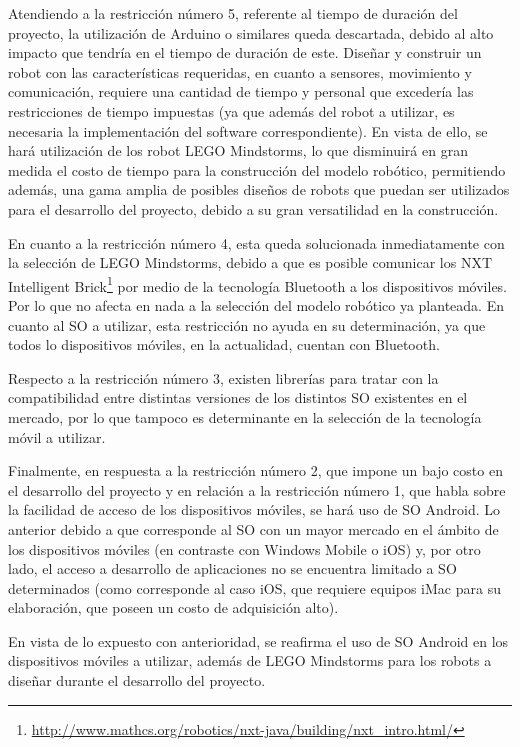 Atendiendo a la restricci\'on n\'umero 5, referente al tiempo de duraci\'on del proyecto, la utilizaci\'on de Arduino o similares queda descartada, debido al alto impacto que tendr\'ia en el tiempo de duraci\'on de este. Dise\~nar y construir un robot con las caracter\'isticas requeridas, en cuanto a sensores, movimiento y comunicaci\'on, requiere una cantidad de tiempo y per\-so\-nal que exceder\'ia las restricciones de tiempo impuestas (ya que adem\'as del robot a utilizar, es necesaria la implementaci\'on del software correspondiente). En vista de ello, se har\'a utilizaci\'on de los robot LEGO Mindstorms, lo que disminuir\'a en gran medida el costo de tiempo para la construcci\'on del modelo rob\'otico, permitiendo adem\'as, una gama amplia de posibles dise\~nos de robots que puedan ser utilizados para el desarrollo del proyecto, debido a su gran versatilidad en la construcci\'on.

En cuanto a la restricci\'on n\'umero 4, esta queda solucionada inmediatamente con la selecci\'on de LEGO Mindstorms, debido a que es posible comunicar los NXT Intelligent Brick\footnote{\url{http://www.mathcs.org/robotics/nxt-java/building/nxt_intro.html/}} por medio de la tecnolog\'ia Bluetooth a los dispositivos m\'oviles. Por lo que no afecta en nada a la selecci\'on del modelo rob\'otico ya planteada. En cuanto al SO a utilizar, esta restricci\'on no ayuda en su determinaci\'on, ya que todos lo dispositivos m\'oviles, en la actualidad, cuentan con Bluetooth.

Respecto a la restricci\'on n\'umero 3, existen librer\'ias para tratar con la compatibilidad entre distintas versiones de los distintos SO existentes en el mercado, por lo que tampoco es determinante en la selecci\'on de la tecnolog\'ia m\'ovil a utilizar.

Finalmente, en respuesta a la restricci\'on n\'umero 2, que impone un bajo costo en el desarrollo del proyecto y en relaci\'on a la restricci\'on n\'umero 1, que habla sobre la facilidad de acceso de los dispositivos m\'oviles, se har\'a uso de SO Android. Lo anterior debido a que corresponde al SO con un mayor mercado en el \'ambito de los dispositivos m\'oviles (en contraste con Windows Mobile o iOS\cite{bib:Tendencias}\cite{bib:MobileDevices}) y, por otro lado, el acceso a desarrollo de aplicaciones no se encuentra limitado a SO determinados (como corresponde al caso iOS, que requiere equipos iMac para su elaboraci\'on, que poseen un costo de adquisici\'on alto).

En vista de lo expuesto con anterioridad, se reafirma el uso de SO Android en los dispositivos m\'oviles a utilizar, adem\'as de LEGO Mindstorms para los robots a dise\~nar durante el desarrollo del proyecto.
